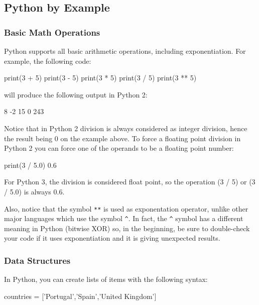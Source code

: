 
\subsection{Python by Example}

\subsubsection{Basic Math Operations}

Python supports all basic arithmetic operations, including exponentiation. For
example, the following code: \begin{python}
print(3 + 5)
print(3 - 5)
print(3 * 5)
print(3 / 5)
print(3 ** 5)
\end{python}

\noindent will produce the following output in Python 2:
\begin{python}
8
-2
15
0
243
\end{python}

Notice that in Python 2 division is always considered as integer division, hence the result
being 0 on the example above. To force a floating point division in Python 2 you can force
one of the operands to be a floating point number: \begin{python}
print(3 / 5.0)
0.6
\end{python}

For Python 3, the division is considered float point, so the operation (3 / 5) or (3 / 5.0) is always 0.6. 

Also, notice that the symbol \texttt{**} is used as exponentation operator, unlike other major languages which use the symbol \texttt{\^}. In fact, the \texttt{\^} symbol has a different meaning in Python (bitwise XOR) so, in the beginning, be sure to double-check your code if it uses exponentiation and it is giving unexpected results.

\subsubsection{Data Structures}

In Python, you can create lists of items with the following syntax:

\begin{python}
countries = ['Portugal','Spain','United Kingdom']
\end{python}


